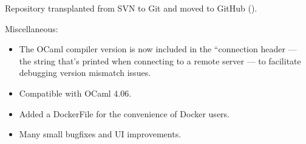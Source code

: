 \begin{changesfromversion}{2.48}
\item Repository transplanted from SVN to Git and moved to GitHub ().
\item Miscellaneous:
\begin{itemize}
\item The OCaml compiler version is now included in the ``connection header
--- the string that's printed when connecting to a remote server --- to
facilitate debugging version mismatch issues.  
\item Compatible with OCaml 4.06.
\item Added a DockerFile for the convenience of Docker users.
\item Many small bugfixes and UI improvements.
\end{itemize}
\end{changesfromversion}

